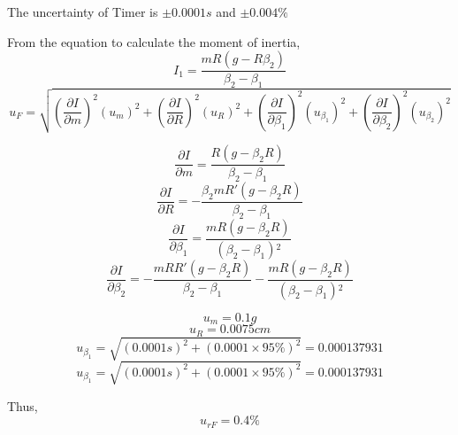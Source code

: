 The uncertainty of Timer is $\pm 0.0001s $ and $\pm 0.004\%$

From the equation to calculate the moment of inertia,
$$ I_1=\frac{mR(g-R\beta_2)}{\beta_2-\beta_1} $$
$$ u_F = \sqrt{(\frac{\partial I}{\partial m})^2(u_m)^2 +   (\frac{\partial I}{\partial R})^2(u_R)^2+(\frac{\partial I}{\partial \beta_1 })^2(u_{\beta_1})^2+ (\frac{\partial I}{\partial \beta_2})^2(u_{\beta_2})^2   }$$

$$\frac{\partial I}{\partial m} = \frac{R\left(g-\beta _2 R\right)}{\beta _2-\beta _1} $$
$$\frac{\partial I}{\partial R} = -\frac{\beta _2 m R'\left(g-\beta _2 R\right)}{\beta _2-\beta _1} $$
$$\frac{\partial I}{\partial \beta_1} = \frac{m R\left(g-\beta _2 R\right)}{\left(\beta _2-\beta _1\right){}^2} $$
$$\frac{\partial I}{\partial \beta_2} = -\frac{m R R'\left(g-\beta _2 R\right)}{\beta _2-\beta _1}-\frac{m R\left(g-\beta _2 R\right)}{\left(\beta _2-\beta _1\right){}^2} $$


$$ u_m = 0.1 g $$
$$ u_R = 0.0075 cm $$
$$ u_{\beta_1} = \sqrt{(0.0001 s)^2+(0.0001 \times 95 \% )^2} =0.000137931 $$
$$ u_{\beta_1} = \sqrt{(0.0001 s)^2+(0.0001 \times 95 \% )^2} =0.000137931 $$

Thus, 
$$u_{rF} =  0.4\%$$

